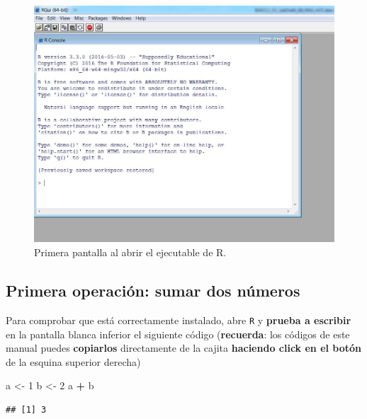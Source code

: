 \documentclass[11pt,]{book}
\newenvironment{Shaded}{\begin{snugshade}}{\end{snugshade}}
\newcommand{\DecValTok}[1]{\textcolor[rgb]{0.06,0.06,0.06}{#1}}
\newcommand{\NormalTok}[1]{#1}
\newcommand{\OperatorTok}[1]{\textcolor[rgb]{0.43,0.43,0.43}{\textbf{#1}}}
\newcommand{\StringTok}[1]{\textcolor[rgb]{0.5,0.5,0.5}{#1}}
\begin{document}
\begin{figure}

{\centering \includegraphics[width=0.75\linewidth]{./img/cranR} 

}

\caption{Primera pantalla al abrir el ejecutable de R.}\label{fig:cranR}
\end{figure}

\hypertarget{primera-operaciuxf3n-sumar-dos-nuxfameros}{%
\subsection{Primera operación: sumar dos números}\label{primera-operaciuxf3n-sumar-dos-nuxfameros}}

Para comprobar que está correctamente instalado, abre \texttt{R} y \textbf{prueba a escribir} en la pantalla blanca inferior el siguiente código (\textbf{recuerda}: los códigos de este manual puedes \textbf{copiarlos} directamente de la cajita \textbf{haciendo click en el botón} de la esquina superior derecha)

\begin{Shaded}
\begin{Highlighting}[]
\NormalTok{a <-}\StringTok{ }\DecValTok{1}
\NormalTok{b <-}\StringTok{ }\DecValTok{2}
\NormalTok{a }\OperatorTok{+}\StringTok{ }\NormalTok{b}
\end{Highlighting}
\end{Shaded}

\begin{verbatim}
## [1] 3
\end{verbatim}
\end{document}
